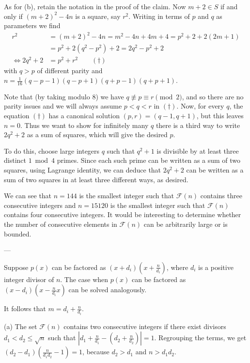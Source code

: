 As for (b), retain the notation in the proof of the claim.
Now $m+2 \in S$ if and only if
$(m+2)^2 - 4n$ is a square, say $r^2$.
Writing in terms of $p$ and $q$ as parameters we find
\begin{align*}
  r^2 &= (m+2)^2 - 4n = m^2-4n + 4m + 4 = p^2 + 2 + 2(2m+1) \\
  &= p^2 + 2(q^2-p^2) + 2 = 2q^2 - p^2 + 2 \\
  \iff 2q^2 + 2 &= p^2 + r^2 \qquad (\dagger)
\end{align*}
with $q > p$ of different parity
and $n = \frac{1}{16} (q-p-1)(q-p+1)(q+p-1)(q+p+1)$.

Note that (by taking modulo $8$) we have $q \not\equiv p \equiv r \pmod 2$,
and so there are no parity issues
and we will always assume $p < q < r$ in $(\dagger)$.
Now, for every $q$, the equation $(\dagger)$
has a canonical solution $(p,r) = (q-1, q+1)$, but this leaves $n = 0$.
Thus we want to show for infinitely many $q$
there is a third way to write $2q^2+2$ as a sum of squares,
which will give the desired $p$.

To do this, choose large integers $q$ such that $q^2+1$
is divisible by at least three distinct $1\bmod4$ primes.
Since each such prime can be written
as a sum of two squares, using Lagrange identity,
we can deduce that $2q^2+2$ can be written as a sum of
two squares in at least three different ways, as desired.

\begin{remark*}
  We can see that $n=144$ is the smallest integer
  such that $\mathcal F(n)$ contains three consecutive integers
  and $n=15120$ is the smallest integer such that $\mathcal F(n)$
  contains four consecutive integers.
  It would be interesting to determine whether
  the number of consecutive elements in $\mathcal F(n)$
  can be arbitrarily large or is bounded.
\end{remark*}

---

Suppose $p(x)$ can be factored as $(x + d_i)(x+\frac{n}{d_i})$, where $d_i$ is a positive integer divisor of $n$.
The case when $p(x)$ can be factored as $(x -d_i)(x-\frac{n}{d_i}x)$ can be solved analogously.

It follows that $m=d_i+\frac{n}{d_i}$.

(a) The set $\mathcal F(n)$ contains two consecutive integers if there exist divisors $d_1 < d_2 \leq \sqrt{n}$
such that $\left| d_1+\frac{n}{d_1}-\left(d_2 +\frac{n}{d_2}\right)\right|=1$. Regrouping the terms,
we get $(d_2-d_1)(\frac{n}{d_1d_2}-1)=1$, because $d_2 > d_1$ and $n > d_1d_2$.

